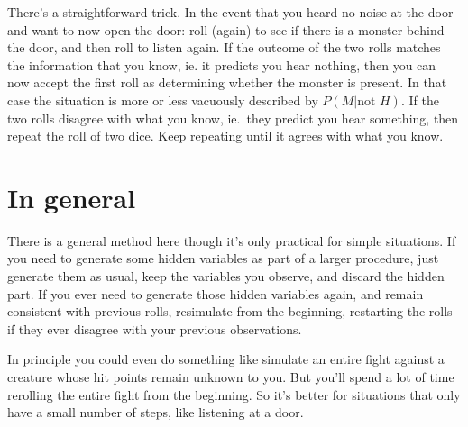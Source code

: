\documentclass[12pt]{article}
\begin{document}
There's a straightforward trick.
In the event that you heard no noise at the door and want to now open the door:
roll (again) to see if there is a monster behind the door, and then roll to listen again.
If the outcome of the two rolls matches the information that you know, ie. it predicts you hear nothing, then you can now accept the first roll as determining whether the monster is present.
In that case the situation is more or less vacuously described by $P(M|\mbox{not }H)$.
If the two rolls disagree with what you know, ie.\ they predict you hear something, then repeat the roll of two dice.
Keep repeating until it agrees with what you know.

\section{In general}
There is a general method here though it's only practical for simple situations.
If you need to generate some hidden variables as part of a larger procedure, just generate them as usual, keep the variables you observe, and discard the hidden part.
If you ever need to generate those hidden variables again, and remain consistent with previous rolls, resimulate from the beginning, restarting the rolls if they ever disagree with your previous observations.

In principle you could even do something like simulate an entire fight against a creature whose hit points remain unknown to you.
But you'll spend a lot of time rerolling the entire fight from the beginning.
So it's better for situations that only have a small number of steps, like listening at a door.
\end{document}
